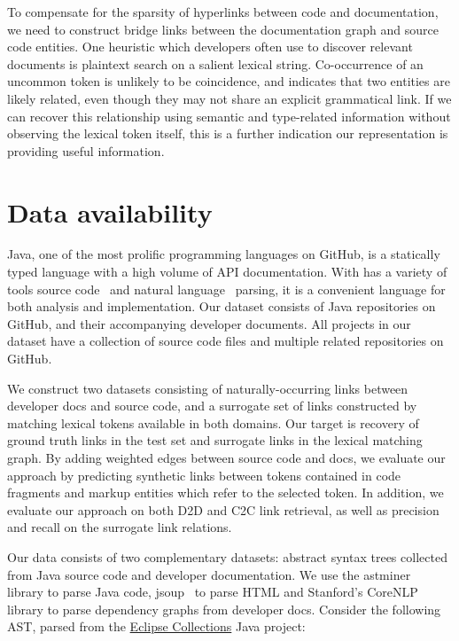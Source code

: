 \documentclass{article}
\begin{document}
To compensate for the sparsity of hyperlinks between code and documentation, we need to construct bridge links between the documentation graph and source code entities. One heuristic which developers often use to discover relevant documents is plaintext search on a salient lexical string. Co-occurrence of an uncommon token is unlikely to be coincidence, and indicates that two entities are likely related, even though they may not share an explicit grammatical link. If we can recover this relationship using semantic and type-related information without observing the lexical token itself, this is a further indication our representation is providing useful information.

\section{Data availability}

Java, one of the most prolific programming languages on GitHub, is a statically typed language with a high volume of API documentation. With has a variety of tools source code~\citep{parr2013definitive, hosseini2013javaparser, kovalenko2019pathminer} and natural language~\citep{manning2014stanford, grella2018non} parsing, it is a convenient language for both analysis and implementation. Our dataset consists of Java repositories on GitHub, and their accompanying developer documents. All projects in our dataset have a collection of source code files and multiple related repositories on GitHub.

We construct two datasets consisting of naturally-occurring links between developer docs and source code, and a surrogate set of links constructed by matching lexical tokens available in both domains. Our target is recovery of ground truth links in the test set and surrogate links in the lexical matching graph. By adding weighted edges between source code and docs, we evaluate our approach by predicting synthetic links between tokens contained in code fragments and markup entities which refer to the selected token. In addition, we evaluate our approach on both D2D and C2C link retrieval, as well as precision and recall on the surrogate link relations.

Our data consists of two complementary datasets: abstract syntax trees collected from Java source code and developer documentation. We use the astminer~\citep{kovalenko2019pathminer} library to parse Java code, jsoup~\citep{hedley2009jsoup} to parse HTML and Stanford's CoreNLP~\citep{manning2014stanford} library to parse dependency graphs from developer docs. Consider the following AST, parsed from the \href{https://www.eclipse.org/collections/}{Eclipse Collections} Java project:
\end{document}
